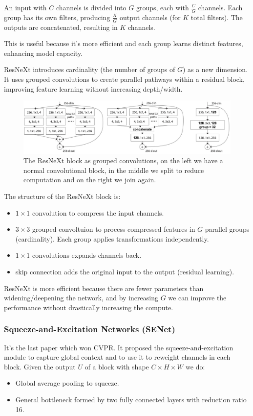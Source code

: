 An input with $C$ channels is divided into $G$ groups, each with $\frac{C}{G}$ channels.
Each group has its own filters, producing $\frac{K}{G}$ output channels (for $K$ total filters).
The outputs are concatenated, resulting in $K$ channels.

This is useful because it's more efficient and each group learns distinct features, enhancing model capacity.

ResNeXt introduces cardinality (the number of groups of $G$) as a new dimension.
It uses grouped convolutions to create parallel pathways within a residual block, improving feature learning without increasing depth/width.

\begin{figure}[htbp]
  \centering
  \includegraphics[width=0.8\linewidth]{./img/resnext_grouped.jpg}
  \caption{The ResNeXt block as grouped convolutions, on the left we have a normal convolutional block, in the middle we split to reduce computation and on the right we join again.}
\end{figure}

The structure of the ResNeXt block is:
\begin{itemize}
  \item $1\times 1$ convolution to compress the input channels.
  \item $3\times 3$ grouped convoltuion to process compressed features in $G$ parallel groups (cardinality). Each group applies transformations independently.
  \item $1\times 1$ convolutions expands channels back.
  \item skip connection adds the original input to the output (residual learning).
\end{itemize}

ResNeXt is more efficient because there are fewer parameters than widening/deepening the network, and by increasing $G$ we can improve the performance without drastically increasing the compute.

\subsubsection{Squeeze-and-Excitation Networks (SENet)}
It's the last paper which won CVPR.
It proposed the squeeze-and-excitation module to capture global context and to use it to reweight channels in each block.
Given the output $U$ of a block with shape $C \times H \times W$ we do:
\begin{itemize}
  \item Global average pooling to squeeze.
  \item General bottleneck formed by two fully connected layers with reduction ratio 16.
\end{itemize}

